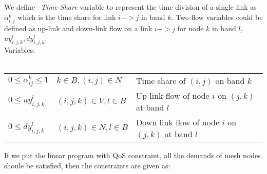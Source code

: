 We define ~\emph{Time Share} variable to represent the time division of a single link as ~\emph{$\alpha_{i,j}^k$} which is the time share for link $i->j$ in band $k$. 
Two flow variables could be defined as up-link and down-link flow on a link $i->j$ for node $k$ in band $l$, $uy_{i,j,k}^l,dy_{i,j,k}^l$.
\\
Variables:\\
\\
\begin{tabular}{llp{3cm}}
$0\le \alpha_{ij}^k \le 1$  & $k\in B, (i,j) \in N$ & 
Time share of $(i,j)$ on band $k$\\ 
$0\le uy_{i,j,k}^l$ & $(i,j,k) \in V, l \in B$ & 
Up link flow of node $i$ on $(j,k)$ at band $l$ \\ 
$0\le dy_{i,j,k}^l$ & $(i,j,k) \in N, l \in B$ & 
Down link flow of node $i$ on $(j,k)$ at band $l$ \\ 
\end{tabular}

If we put the linear program with QoS constraint, all the demands of mesh nodes shoule be satisfied, then the constraints are given as:

\vspace{1pt}


